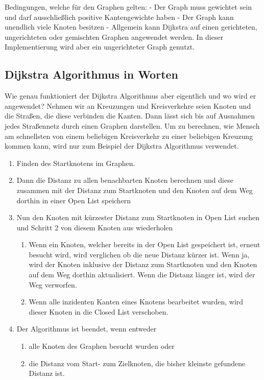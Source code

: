 \documentclass[a4paper]{article}
\begin{document}
Bedingungen, welche für den Graphen gelten:
- Der Graph muss gewichtet sein und darf ausschließlich positive Kantengewichte haben
- Der Graph kann unendlich viele Knoten besitzen
- Allgemein kann Dijkstra auf einen gerichteten, ungerichteten oder gemischten Graphen angewendet werden. In dieser Implementierung wird aber ein ungerichteter Graph genutzt.

\subsection{Dijkstra Algorithmus in Worten}

Wie genau funktioniert der Dijkstra Algorithmus aber eigentlich und wo wird er angewendet?
Nehmen wir an Kreuzungen und Kreisverkehre seien Knoten und die Straßen, die diese verbinden die Kanten. Dann lässt sich bis auf Ausnahmen jedes Straßennetz durch einen Graphen darstellen. Um zu berechnen, wie Mensch am schnellsten von einem beliebigen Kreisverkehr zu einer beliebigen Kreuzung kommen kann, wird nur zum Beispiel der Dijkstra Algorithmus verwendet.

\begin{enumerate}
    \item Finden des Startknotens im Graphen.
    \item Dann die Distanz zu allen benachbarten Knoten berechnen und diese zusammen mit der Distanz zum Startknoten und den Knoten auf dem Weg dorthin in einer Open List speichern
    
    \item Nun den Knoten mit kürzester Distanz zum Startknoten in Open List suchen und Schritt 2 von diesem Knoten aus wiederholen
    \begin{enumerate}
        \item Wenn ein Knoten, welcher bereits in der Open List gespeichert ist, erneut besucht wird, wird verglichen ob die neue Distanz kürzer ist. Wenn ja, wird der Knoten inklusive der Distanz zum Startknoten und den Knoten auf dem Weg dorthin aktualisiert. Wenn die Distanz länger ist, wird der Weg verworfen.
        \item Wenn alle inzidenten Kanten eines Knotens bearbeitet wurden, wird dieser Knoten in die Closed List verschoben.
    \end{enumerate}

    \item Der Algorithmus ist beendet, wenn entweder
    \begin{enumerate}
        \item alle Knoten des Graphen besucht wurden oder
        \item die Distanz vom Start- zum Zielknoten, die bisher kleinste gefundene Distanz ist.
    \end{enumerate}
    
\end{enumerate}
\end{document}

